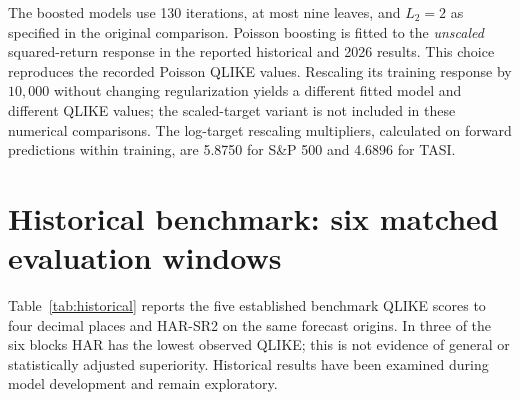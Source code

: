 The boosted models use 130 iterations, at most nine leaves, and $L_2=2$ as specified in the original comparison. Poisson boosting is fitted to the \emph{unscaled} squared-return response in the reported historical and 2026 results. This choice reproduces the recorded Poisson QLIKE values. Rescaling its training response by $10{,}000$ without changing regularization yields a different fitted model and different QLIKE values; the scaled-target variant is not included in these numerical comparisons. The log-target rescaling multipliers, calculated on forward predictions within training, are 5.8750 for S\&P 500 and 4.6896 for TASI.

\section{Historical benchmark: six matched evaluation windows}
Table~\ref{tab:historical} reports the five established benchmark QLIKE scores to four decimal places and HAR-SR2 on the same forecast origins. In three of the six blocks HAR has the lowest observed QLIKE; this is not evidence of general or statistically adjusted superiority. Historical results have been examined during model development and remain exploratory.

\begin{table}[ht]
\centering\small
\caption{Historical mean QLIKE by market and block (smaller is better).}\label{tab:historical}
\end{table}

